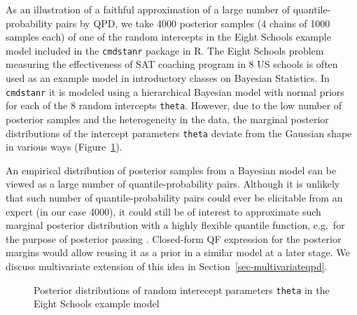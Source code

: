 \documentclass[
  fleqn,
  deca,
  blindrev
]{informs4}
\begin{document}
As an illustration of a faithful approximation of a large number of
quantile-probability pairs by QPD, we take 4000 posterior samples (4
chains of 1000 samples each) of one of the random intercepts in the
Eight Schools example model included in the \texttt{cmdstanr} package
\citep{gabry2022CmdstanrInterfaceCmdStan} in R. The Eight Schools
problem \citep{rubin1981EstimationParallelRandomized} measuring the
effectiveness of SAT coaching program in 8 US schools is often used as
an example model in introductory classes on Bayesian Statistics. In
\texttt{cmdstanr} it is modeled using a hierarchical Bayesian model with
normal priors for each of the 8 random intercepts \texttt{theta}.
However, due to the low number of posterior samples and the
heterogeneity in the data, the marginal posterior distributions of the
intercept parameters \texttt{theta} deviate from the Gaussian shape in
various ways (Figure~\ref{fig-school-thetas}).

An empirical distribution of posterior samples from a Bayesian model can
be viewed as a large number of quantile-probability pairs. Although it
is unlikely that such number of quantile-probability pairs could ever be
elicitable from an expert (in our case 4000), it could still be of
interest to approximate such marginal posterior distribution with a
highly flexible quantile function, e.g.~for the purpose of posterior
passing
\citep{brand2019CumulativeScienceBayesian, pritsker2021ComparingBayesianPosterior}.
Closed-form QF expression for the posterior margins would allow reusing
it as a prior in a similar model at a later stage. We discuss
multivariate extension of this idea in
Section~\ref{sec-multivariateqpd}.

\begin{figure}


\caption{\label{fig-school-thetas}Posterior distributions of random
interecept parameters \texttt{theta} in the Eight Schools example model
\citep{gabry2022CmdstanrInterfaceCmdStan}}

\end{figure}%
\end{document}
